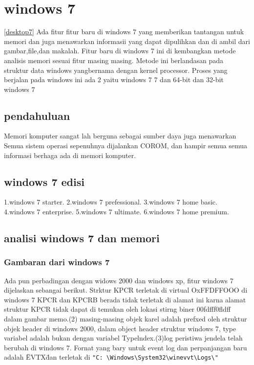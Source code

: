 	\section{windows 7}
\ref{desktop7}
		Ada fitur fitur baru di windows 7 yang memberikan tantangan untuk memori
		dan juga menawarkan informasii yang dapat dipulihkan dan di ambil dari
		gambar,file,dan makalah. Fitur baru di windows 7 ini di kembangkan 
		metode analisis memori sesuai fitur masing masing. Metode ini
		berlandasan pada struktur data windows yangbernama dengan kernel
		processor. Proses yang berjalan pada windows ini ada 2 yaitu windows 7 
		7 dan 64-bit dan 32-bit windows 7
		\subsection{pendahuluan}
			Memori komputer sangat lah berguna sebagai sumber daya juga menawarkan
			Semua sistem operasi sepenuhnya dijalankan COROM, dan hampir semua
			semua informasi berhaga ada di memori komputer.
		\subsection{windows 7 edisi}
			1.windows 7 starter.
			2.windows 7 prefessional.
			3.windows 7 home basic.
			4.windows 7 enterprise.
			5.windows 7 ultimate.
			6.windows 7 home premium.
		\subsection{analisi windows 7 dan memori}
			\subsubsection{Gambaran dari windows 7}
				Ada pun perbadingan dengan widows 2000 dan windows xp, fitur windows 7 
				dijelaskan sebangai berikut. Strktur KPCR terletak di virtual OxFFDFFOOO
				di windows 7 KPCR dan KPCRB berada tidak terletak di alamat ini karna
				alamat struktur KPCR tidak dapat di temukan oleh lokasi stirng biner 
				00fdfff0fldff dalam gambar memo.(2) masing-masing objek karel adalah 
				prefxed oleh struktur objek header di windows 2000, dalam object header
				struktur windows 7, type variabel adalah bukan dengan variabel 
				Typelndex.(3)log peristiwa jendela telah berubah di windows 7. Fornat 
				yang bary untuk event log dan perpanjangan baru adalah \"EVTX\" 
				dan terletak di \verb|"C: \Windows\System32\winevvt\Logs\"|
